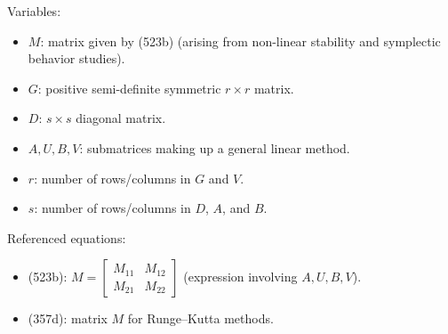 Variables:
\begin{itemize}
    \item $M$: matrix given by (523b) (arising from non-linear stability and symplectic behavior studies).
    \item $G$: positive semi-definite symmetric $r \times r$ matrix.
    \item $D$: $s \times s$ diagonal matrix.
    \item $A, U, B, V$: submatrices making up a general linear method.
    \item $r$: number of rows/columns in $G$ and $V$.
    \item $s$: number of rows/columns in $D$, $A$, and $B$.
\end{itemize}

Referenced equations:
\begin{itemize}
    \item (523b): $M = \begin{bmatrix} M_{11} & M_{12} \\ M_{21} & M_{22} \end{bmatrix}$ (expression involving $A,U,B,V$).
    \item (357d): matrix $M$ for Runge--Kutta methods.
\end{itemize}

